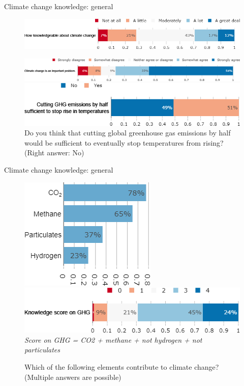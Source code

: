 \documentclass[aspectratio=169,9pt,dvipsnames]{beamer}
\begin{document}
\begin{frame}{Climate change knowledge: general}%
\begin{figure}[h!]
\centering
\caption{How knowledgeable do you consider yourself about climate change?}
\includegraphics[width=.8\textwidth]{../figures/US/CC_knowledgeable_US.png}
\\
\centering
\caption{Do you agree or disagree with the following statement: ``Climate change is an important problem."}
\includegraphics[width=.9\textwidth]{../figures/US/CC_problem_US.png}
\centering
\caption{Do you think that cutting global greenhouse gas emissions by half would be sufficient to eventually stop temperatures from rising? (Right answer: No)}
\includegraphics[width=.7\textwidth]{../figures/US/CC_dynamic_US.png}
\end{figure}
\end{frame}

\begin{frame}{Climate change knowledge: general}%
\begin{figure}[h!]
\centering
\caption{Which of the following elements contribute to climate change? (Multiple answers are possible)  }
\centering
\includegraphics[width=.35\textwidth]{../figures/US/GHG_US.png}
\vspace{.2cm} \\
\includegraphics[width=.7\textwidth]{../figures/US/score_GHG_US.png}
\textit{Score on GHG = CO2 + methane + \textit{not} hydrogen + \textit{not}  particulates}
\end{figure}
\end{frame}
\end{document}
